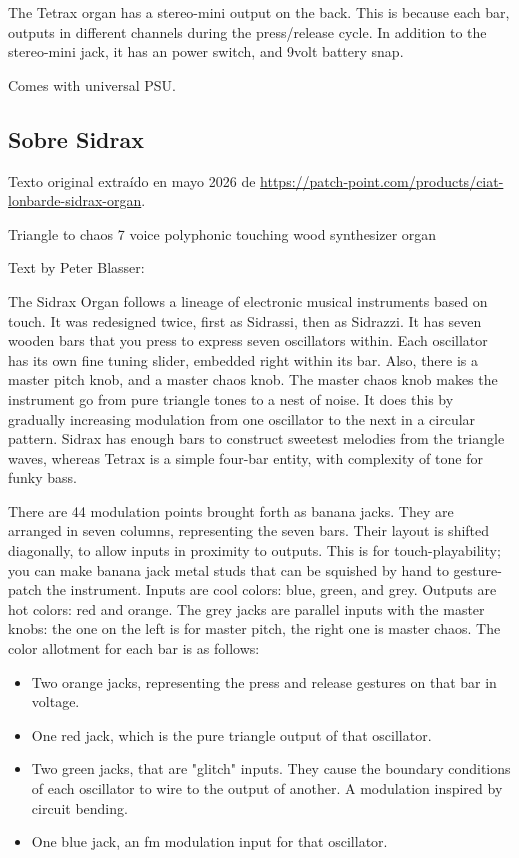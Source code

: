 The Tetrax organ has a stereo-mini output on the back. This is because each bar, outputs in different channels during the press/release cycle. In addition to the stereo-mini jack, it has an power switch, and 9volt battery snap.

Comes with universal PSU.

\newpage

\subsection{Sobre Sidrax}

Texto original extraído en mayo 2026 de \url{https://patch-point.com/products/ciat-lonbarde-sidrax-organ}.

Triangle to chaos 7 voice polyphonic touching wood synthesizer organ

Text by Peter Blasser:

The Sidrax Organ follows a lineage of electronic musical instruments based on touch. It was redesigned twice, first as Sidrassi, then as Sidrazzi. It has seven wooden bars that you press to express seven oscillators within. Each oscillator has its own fine tuning slider, embedded right within its bar. Also, there is a master pitch knob, and a master chaos knob. The master chaos knob makes the instrument go from pure triangle tones to a nest of noise. It does this by gradually increasing modulation from one oscillator to the next in a circular pattern. Sidrax has enough bars to construct sweetest melodies from the triangle waves, whereas Tetrax is a simple four-bar entity, with complexity of tone for funky bass.

There are 44 modulation points brought forth as banana jacks. They are arranged in seven columns, representing the seven bars. Their layout is shifted diagonally, to allow inputs in proximity to outputs. This is for touch-playability; you can make banana jack metal studs that can be squished by hand to gesture-patch the instrument. Inputs are cool colors: blue, green, and grey. Outputs are hot colors: red and orange. The grey jacks are parallel inputs with the master knobs: the one on the left is for master pitch, the right one is master chaos. The color allotment for each bar is as follows:

\begin{itemize}
	\item Two orange jacks, representing the press and release gestures on that bar in voltage.
	\item One red jack, which is the pure triangle output of that oscillator.
	\item Two green jacks, that are "glitch" inputs. They cause the boundary conditions of each oscillator to wire to the output of another. A modulation inspired by circuit bending.
	\item One blue jack, an fm modulation input for that oscillator.
\end{itemize}


